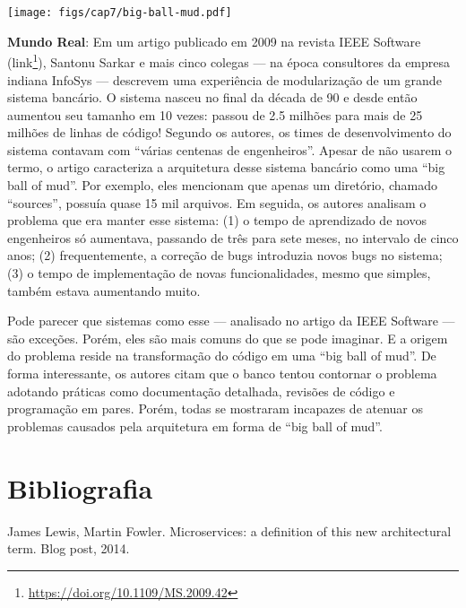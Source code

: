 \documentclass[
  11pt,
  twoside]{book}
\DeclareRobustCommand{\href}[2]{#2\footnote{\url{#1}}}
\newenvironment{esmbox}{\centering \vspace{1.5ex} \begin{tcolorbox}[breakable, colback=backcolor, width=4.9in]}{\end{tcolorbox} \vspace{1.5ex}}
\let\origfigure\figure
\let\endorigfigure\endfigure
\renewenvironment{figure}[1][2] {
    \expandafter\origfigure\expandafter[!h]
} {
    \endorigfigure
}
\begin{document}
\begin{figure}
\centering
\texttt{[image: figs/cap7/big-ball-mud.pdf]}
\caption{Anti-padrão \emph{big ball of mud}}
\end{figure}


\begin{esmbox}

\textbf{Mundo Real}: Em um artigo publicado em 2009 na revista IEEE
Software (\href{https://doi.org/10.1109/MS.2009.42}{link}), Santonu
Sarkar e mais cinco colegas --- na época consultores da empresa indiana
InfoSys --- descrevem uma experiência de modularização de um grande
sistema bancário. O sistema nasceu no final da década de 90 e desde
então aumentou seu tamanho em 10 vezes: passou de 2.5 milhões para mais
de 25 milhões de linhas de código! Segundo os autores, os times de
desenvolvimento do sistema contavam com ``várias centenas de
engenheiros''. Apesar de não usarem o termo, o artigo caracteriza a
arquitetura desse sistema bancário como uma ``big ball of mud''. Por
exemplo, eles mencionam que apenas um diretório, chamado ``sources'',
possuía quase 15 mil arquivos. Em seguida, os autores analisam o
problema que era manter esse sistema: (1) o tempo de aprendizado de
novos engenheiros só aumentava, passando de três para sete meses, no
intervalo de cinco anos; (2) frequentemente, a correção de bugs
introduzia novos bugs no sistema; (3) o tempo de implementação de novas
funcionalidades, mesmo que simples, também estava aumentando muito.

Pode parecer que sistemas como esse --- analisado no artigo da IEEE
Software --- são exceções. Porém, eles são mais comuns do que se pode
imaginar. E a origem do problema reside na transformação do código em
uma ``big ball of mud''. De forma interessante, os autores citam que o
banco tentou contornar o problema adotando práticas como documentação
detalhada, revisões de código e programação em pares. Porém, todas se
mostraram incapazes de atenuar os problemas causados pela arquitetura em
forma de ``big ball of mud''.

\end{esmbox}

\hypertarget{bibliografia-6}{%
\section*{Bibliografia}\label{bibliografia-6}}

James Lewis, Martin Fowler. Microservices: a definition of this new
architectural term. Blog post, 2014.
\end{document}
